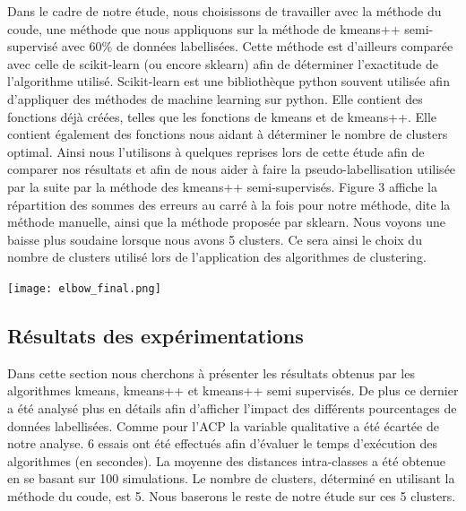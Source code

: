 \documentclass[12pt,a4paper]{book}
\newcommand{\1}{\mathds{1}}
\begin{document}
\vspace{10 mm}
\noindent
Dans le cadre de notre étude, nous choisissons de travailler avec la méthode du coude, une méthode que nous appliquons sur la méthode de kmeans++ semi-supervisé avec 60\% de données labellisées. Cette méthode est d'ailleurs comparée avec celle de scikit-learn (ou encore sklearn) afin de déterminer l'exactitude de l'algorithme utilisé. Scikit-learn est une bibliothèque python souvent utilisée afin d’appliquer des méthodes de machine learning sur python. Elle contient des fonctions déjà créées, telles que les fonctions de kmeans et de kmeans++. Elle contient également des fonctions nous aidant à déterminer le nombre de clusters optimal. Ainsi nous l’utilisons à quelques reprises lors de cette étude afin de comparer nos résultats et afin de nous aider à faire la pseudo-labellisation utilisée par la suite par la méthode des kmeans++ semi-supervisés. Figure 3 affiche la répartition des sommes des erreurs au carré à la fois pour notre méthode, dite la méthode manuelle, ainsi que la méthode proposée par sklearn. Nous voyons une baisse plus soudaine lorsque nous avons 5 clusters. Ce sera ainsi le choix du nombre de clusters utilisé lors de l'application des algorithmes de clustering.

\begin{center}
\texttt{[image: elbow\_final.png]}
\end{center}

\vspace{10 mm}
\noindent
\begin{large}
\subsection{Résultats des expérimentations}
\end{large}
\vspace{10 mm}

\noindent
Dans cette section nous cherchons à présenter les résultats obtenus par les algorithmes kmeans, kmeans++ et kmeans++ semi supervisés. De plus ce dernier a été analysé plus en détails afin d'afficher l'impact des différents pourcentages de données labellisées. Comme pour l'ACP la variable qualitative a été écartée de notre analyse.
6 essais ont été effectués afin d'évaluer le temps d'exécution des algorithmes (en secondes). La moyenne des distances intra-classes a été obtenue en se basant sur 100 simulations. Le nombre de clusters, déterminé en utilisant la méthode du coude, est 5. Nous baserons le reste de notre étude sur ces 5 clusters.
\end{document}
